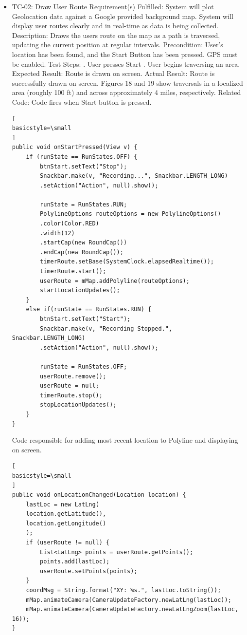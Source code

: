 ﻿\documentclass{article}
\begin{document}
\begin {itemize}
\item TC-02: Draw User Route
\subitem Requirement(s) Fulfilled:
\subsubitem System will plot Geolocation data against a Google provided background map.
\subsubitem System will display user routes clearly and in real-time as data is being collected.
\subitem Description: Draws the users route on the map as a path is traversed, updating the current position at regular intervals.
\subitem Precondition: User's location has been found, and the Start Button has been pressed. GPS must be enabled.
\subitem Test Steps:
. User presses Start
. User begins traversing an area.
\subitem Expected Result: Route is drawn on screen.
\subitem Actual Result: Route is successfully drawn on screen. Figures 18 and 19 show traversals in a localized area (roughly 100 ft) and across approximately 4 miles, respectively.
\subitem Related Code:
Code fires when Start button is pressed.
\begin{lstlisting}[
basicstyle=\small
]
public void onStartPressed(View v) {
    if (runState == RunStates.OFF) {
        btnStart.setText("Stop");
        Snackbar.make(v, "Recording...", Snackbar.LENGTH_LONG)
        .setAction("Action", null).show();

        runState = RunStates.RUN;
        PolylineOptions routeOptions = new PolylineOptions()
        .color(Color.RED)
        .width(12)
        .startCap(new RoundCap())
        .endCap(new RoundCap());
        timerRoute.setBase(SystemClock.elapsedRealtime());
        timerRoute.start();
        userRoute = mMap.addPolyline(routeOptions);
        startLocationUpdates();
    }
    else if(runState == RunStates.RUN) {
        btnStart.setText("Start");
        Snackbar.make(v, "Recording Stopped.", Snackbar.LENGTH_LONG)
        .setAction("Action", null).show();

        runState = RunStates.OFF;
        userRoute.remove();
        userRoute = null;
        timerRoute.stop();
        stopLocationUpdates();
    }
}
\end{lstlisting}
Code responsible for adding most recent location to Polyline and displaying on screen.
\begin{lstlisting}[
basicstyle=\small
]
public void onLocationChanged(Location location) {
    lastLoc = new LatLng(
    location.getLatitude(),
    location.getLongitude()
    );
    if (userRoute != null) {
        List<LatLng> points = userRoute.getPoints();
        points.add(lastLoc);
        userRoute.setPoints(points);
    }
    coordMsg = String.format("XY: %s.", lastLoc.toString());
    mMap.animateCamera(CameraUpdateFactory.newLatLng(lastLoc));
    mMap.animateCamera(CameraUpdateFactory.newLatLngZoom(lastLoc, 16));
}
\end{lstlisting}


\end{itemize}
\end{document}
